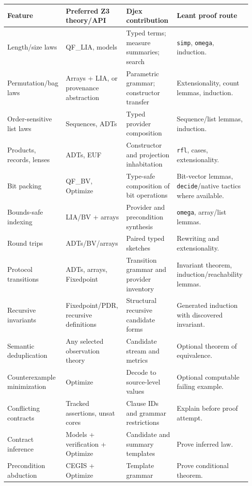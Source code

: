 \documentclass[11pt,oneside]{article}
\newcommand{\code}[1]{\texttt{#1}}
\begin{document}
\begin{small}
\begin{longtable}{@{}L{0.19\textwidth}L{0.24\textwidth}L{0.27\textwidth}L{0.21\textwidth}@{}}
\toprule
\textbf{Feature} & \textbf{Preferred Z3 theory/API} & \textbf{Djex contribution} &
\textbf{Leant proof route} \\
\midrule
\endhead
Length/size laws & QF\_LIA, models & Typed terms; measure summaries; search &
\code{simp}, \code{omega}, induction. \\
Permutation/bag laws & Arrays + LIA, or provenance abstraction & Parametric grammar;
constructor transfer & Extensionality, count lemmas, induction. \\
Order-sensitive list laws & Sequences, ADTs & Typed provider composition & Sequence/list
lemmas, induction. \\
Products, records, lenses & ADTs, EUF & Constructor and projection inhabitation & \code{rfl},
cases, extensionality. \\
Bit packing & QF\_BV, Optimize & Type-safe composition of bit operations & Bit-vector
lemmas, \code{decide}/native tactics where available. \\
Bounds-safe indexing & LIA/BV + arrays & Provider and precondition synthesis &
\code{omega}, array/list lemmas. \\
Round trips & ADTs/BV/arrays & Paired typed sketches & Rewriting and extensionality. \\
Protocol transitions & ADTs, arrays, Fixedpoint & Transition grammar and provider inventory &
Invariant theorem, induction/reachability lemmas. \\
Recursive invariants & Fixedpoint/PDR, recursive definitions & Structural recursive
candidate forms & Generated induction with discovered invariant. \\
Semantic deduplication & Any selected observation theory & Candidate stream and metrics &
Optional theorem of equivalence. \\
Counterexample minimization & Optimize & Decode to source-level values & Optional
computable failing example. \\
Conflicting contracts & Tracked assertions, unsat cores & Clause IDs and grammar
restrictions & Explain before proof attempt. \\
Contract inference & Models + verification + Optimize & Candidate and summary templates &
Prove inferred law. \\
Precondition abduction & CEGIS + Optimize & Template grammar & Prove conditional theorem. \\
\bottomrule
\end{longtable}
\end{small}
\end{document}
